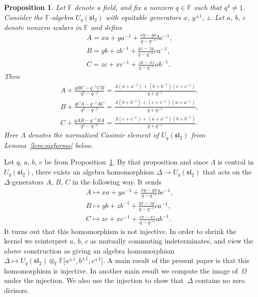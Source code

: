 \documentclass[pdftex]{sigma}
\numberwithin{equation}{section}
\newtheorem{Proposition}[Theorem]{Proposition}
{\theoremstyle{definition}
\newtheorem{Note}[Theorem]{Note}
\newtheorem{Definition}[Theorem]{Definition}
\newtheorem{Problem}[Theorem]{Problem}
}
\begin{document}
\begin{Proposition}
\label{prop:motiv}
Let $\mathbb F$ denote a field, and
fix a nonzero $q \in \mathbb F$ such that $q^4\not=1$.
Consider the $\mathbb F$-algebra
$U_q(\mathfrak{sl}_2)$
with equitable generators
$x$, $y^{\pm 1}$, $z$.
Let $a$, $b$, $c$ denote nonzero scalars in $\mathbb F$  and define
\begin{gather*}
A =  x a + y a^{-1} + \frac{xy-yx}{q-q^{-1}}bc^{-1},
\\
B =  y b + z b^{-1} + \frac{yz-zy}{q-q^{-1}}ca^{-1},
\\
C =  z c + x c^{-1} + \frac{zx-xz}{q-q^{-1}}ab^{-1}.
\end{gather*}
Then
\begin{gather*}
A+ \frac{qBC-q^{-1}CB}{q^2-q^{-2}}
=
\frac{
\Lambda (a+a^{-1})+(b+b^{-1})(c+c^{-1})
}{q+q^{-1}},
\\
B+
\frac{qCA-q^{-1}AC}{q^2-q^{-2}}
=
\frac{
\Lambda (b+b^{-1})+(c+c^{-1})(a+a^{-1})
}
{q+q^{-1}},
\\
C+
\frac{qAB-q^{-1}BA}{q^2-q^{-2}}
=
\frac{
\Lambda (c+c^{-1})+(a+a^{-1})(b+b^{-1})
}{q+q^{-1}}.
\end{gather*}
Here $\Lambda$ denotes the normalized
Casimir element of
$U_q(\mathfrak{sl}_2)$
from Lemma~{\rm \ref{lem:sixforms}} below.
\end{Proposition}


Let $q$, $a$, $b$, $c$ be from
Proposition~\ref{prop:motiv}. By that proposition
and since $\Lambda$ is central in
$U_q(\mathfrak{sl}_2)$,
there exists an algebra homomorphism
$\Delta \to
U_q(\mathfrak{sl}_2)$
that acts on the $\Delta$-generators
$A$, $B$, $C$ in the following way. It sends
\begin{gather*}
A \mapsto  x a + y a^{-1} + \frac{xy-yx}{q-q^{-1}}bc^{-1},
\\
B  \mapsto   y b + z b^{-1} + \frac{yz-zy}{q-q^{-1}}ca^{-1},
\\
C  \mapsto   z c + x c^{-1} + \frac{zx-xz}{q-q^{-1}}ab^{-1}.
\end{gather*}
It turns out that this homomorphism is not injective. In order
to shrink
the kernel
we reinterpret $a$, $b$, $c$ as mutually commuting indeterminates,
and view the above construction as giving an algebra homomorphism
$\Delta \mapsto
U_q(\mathfrak{sl}_2) \otimes_\mathbb F
\mathbb F \lbrack a^{\pm 1}, b^{\pm 1}, c^{\pm 1}\rbrack$.
A main result of the present paper is that this homomorphism is injective.
In another main result we compute the image of~$\Omega $ under the injection.
We also use the injection to show that~$\Delta$
contains no zero divisors.
\end{document}
